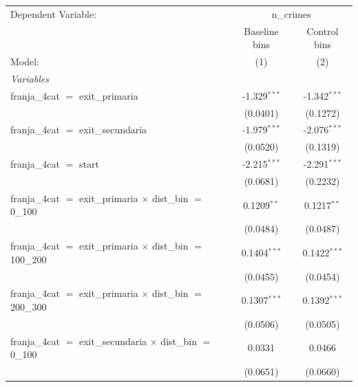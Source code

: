 
\begingroup
\centering
\tiny
\begin{tabular}{lcc}
   \tabularnewline \midrule \midrule
   Dependent Variable: & \multicolumn{2}{c}{n\_crimes}\\
                                                                          & Baseline bins   & Control bins \\   
   Model:                                                                 & (1)             & (2)\\  
   \midrule
   \emph{Variables}\\
   franja\_4cat $=$ exit\_primaria                                        & -1.329$^{***}$  & -1.342$^{***}$\\   
                                                                          & (0.0401)        & (0.1272)\\   
   franja\_4cat $=$ exit\_secundaria                                      & -1.979$^{***}$  & -2.076$^{***}$\\   
                                                                          & (0.0520)        & (0.1319)\\   
   franja\_4cat $=$ start                                                 & -2.215$^{***}$  & -2.291$^{***}$\\   
                                                                          & (0.0681)        & (0.2232)\\   
   franja\_4cat $=$ exit\_primaria $\times$ dist\_bin $=$ 0\_100          & 0.1209$^{**}$   & 0.1217$^{**}$\\   
                                                                          & (0.0484)        & (0.0487)\\   
   franja\_4cat $=$ exit\_primaria $\times$ dist\_bin $=$ 100\_200        & 0.1404$^{***}$  & 0.1422$^{***}$\\   
                                                                          & (0.0455)        & (0.0454)\\   
   franja\_4cat $=$ exit\_primaria $\times$ dist\_bin $=$ 200\_300        & 0.1307$^{***}$  & 0.1392$^{***}$\\   
                                                                          & (0.0506)        & (0.0505)\\   
   franja\_4cat $=$ exit\_secundaria $\times$ dist\_bin $=$ 0\_100        & 0.0331          & 0.0466\\   
                                                                          & (0.0651)        & (0.0660)\\   

\end{tabular}

